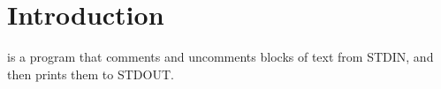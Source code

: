 \section{Introduction}

 is a program that comments and uncomments blocks of text from STDIN, and then prints them to STDOUT.
